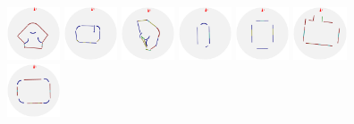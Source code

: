 \begin{figure}[t]
  \includegraphics[width=0.14\textwidth]{p4m_3_2D_walls_rotate}%
  \includegraphics[width=0.14\textwidth]{p4m_4_2D_walls_rotate}%
  \includegraphics[width=0.14\textwidth]{p4m_6_2D_walls_rotate}%
  \includegraphics[width=0.14\textwidth]{p4m_7_2D_walls_rotate}%
  \includegraphics[width=0.14\textwidth]{p4m_10_2D_walls_rotate}%
  \includegraphics[width=0.14\textwidth]{p4m_11_2D_walls_rotate}%
  \includegraphics[width=0.14\textwidth]{p4m_12_2D_walls_rotate}%
\vspace{-0.32\textwidth}%
\\
\begin{small}
\begin{minipage}{0.28\textwidth}~\end{minipage}
\begin{minipage}{0.28\textwidth}~\end{minipage}
\begin{minipage}{0.28\textwidth}~\end{minipage}

\end{small}
\end{figure}
